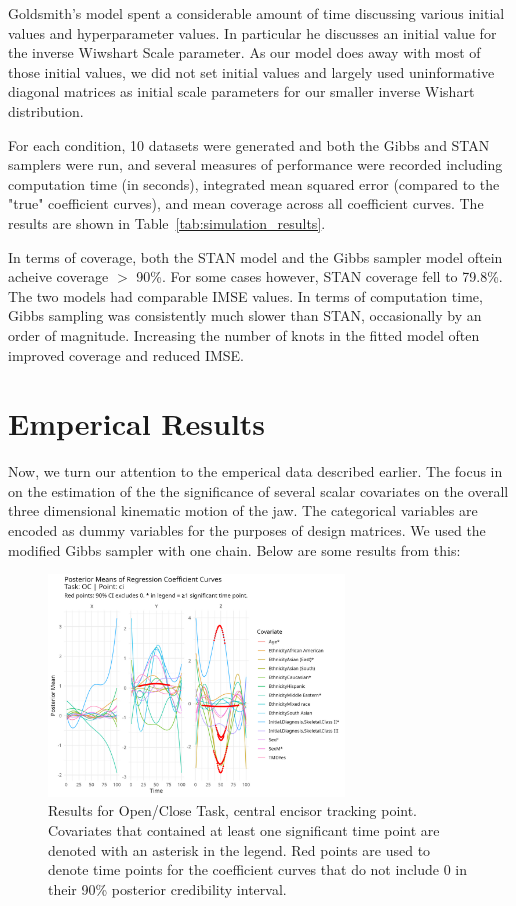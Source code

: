 \documentclass[AMA,Times1COL]{WileyNJDv5} %
\begin{document}
Goldsmith's model spent a considerable amount of time discussing various initial values and hyperparameter values.  In particular he discusses an initial value for the inverse Wiwshart Scale parameter.  As our model does away with most of those initial values, we did not set initial values and largely used uninformative diagonal matrices as initial scale parameters for our smaller inverse Wishart distribution.

For each condition, 10 datasets were generated and both the Gibbs and STAN samplers were run, and several measures of performance were recorded including computation time (in seconds), integrated mean squared error (compared to the "true" coefficient curves), and mean coverage across all coefficient curves.  The results are shown in Table~\ref{tab:simulation_results}.  

In terms of coverage, both the STAN model and the Gibbs sampler model oftein acheive coverage \(>\) 90\%.  For some cases however, STAN coverage fell to 79.8\%.  The two models had comparable IMSE values.  In terms of computation time, Gibbs sampling was consistently much slower than STAN, occasionally by an order of magnitude.  Increasing the number of knots in the fitted model often improved coverage and reduced IMSE.  

\section{Emperical Results}
Now, we turn our attention to the emperical data described earlier.  The focus in on the estimation of the the significance of several scalar covariates on the overall three dimensional kinematic motion of the jaw.  The categorical variables are encoded as dummy variables for the purposes of design matrices.  We used the modified Gibbs sampler with one chain.  Below are some results from this: 

\begin{figure}[h]
    \centering
    \includegraphics[width = 0.7\textwidth]{oc_ci_plot.jpeg}
    \caption{Results for Open/Close Task, central encisor tracking point.  Covariates that contained at least one significant time point are denoted with an asterisk in the legend.  Red points are used to denote time points for the coefficient curves that do not include 0 in their 90\% posterior credibility interval.}
    \label{fig:oc_ci}
\end{figure}
\end{document}
